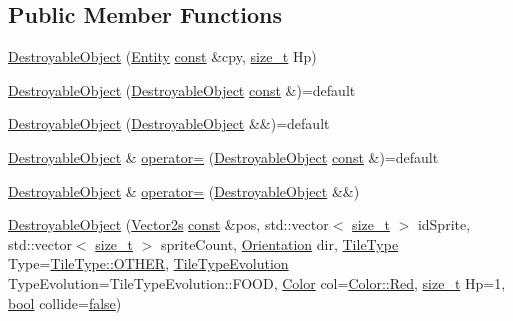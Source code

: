 \subsection*{Public Member Functions}
\begin{DoxyCompactItemize}
\item 
\hyperlink{classarcade_1_1_destroyable_object_afad8b631d299b327eb9c3df2bcaec2b4}{Destroyable\-Object} (\hyperlink{classarcade_1_1_entity}{Entity} \hyperlink{term__entry_8h_a57bd63ce7f9a353488880e3de6692d5a}{const} \&cpy, \hyperlink{nc__alloc_8h_a7b60c5629e55e8ec87a4547dd4abced4}{size\-\_\-t} Hp)
\item 
\hyperlink{classarcade_1_1_destroyable_object_a928fd49d151580c8324ff6e139fa3278}{Destroyable\-Object} (\hyperlink{classarcade_1_1_destroyable_object}{Destroyable\-Object} \hyperlink{term__entry_8h_a57bd63ce7f9a353488880e3de6692d5a}{const} \&)=default
\item 
\hyperlink{classarcade_1_1_destroyable_object_aecbe032df2fc04fa2067507e9cdb57dc}{Destroyable\-Object} (\hyperlink{classarcade_1_1_destroyable_object}{Destroyable\-Object} \&\&)=default
\item 
\hyperlink{classarcade_1_1_destroyable_object}{Destroyable\-Object} \& \hyperlink{classarcade_1_1_destroyable_object_a240c22db6bea4eb1dd04bc5bf6896811}{operator=} (\hyperlink{classarcade_1_1_destroyable_object}{Destroyable\-Object} \hyperlink{term__entry_8h_a57bd63ce7f9a353488880e3de6692d5a}{const} \&)=default
\item 
\hyperlink{classarcade_1_1_destroyable_object}{Destroyable\-Object} \& \hyperlink{classarcade_1_1_destroyable_object_a2c832153b56e69aeec898c9df2b2b15f}{operator=} (\hyperlink{classarcade_1_1_destroyable_object}{Destroyable\-Object} \&\&)
\item 
\hyperlink{classarcade_1_1_destroyable_object_a196652119c01e1e1a647e69ef11a88c9}{Destroyable\-Object} (\hyperlink{namespacearcade_a8e527f7400fbff9c38dc31e0a3dd06a1}{Vector2s} \hyperlink{term__entry_8h_a57bd63ce7f9a353488880e3de6692d5a}{const} \&pos, std\-::vector$<$ \hyperlink{nc__alloc_8h_a7b60c5629e55e8ec87a4547dd4abced4}{size\-\_\-t} $>$ id\-Sprite, std\-::vector$<$ \hyperlink{nc__alloc_8h_a7b60c5629e55e8ec87a4547dd4abced4}{size\-\_\-t} $>$ sprite\-Count, \hyperlink{namespacearcade_a370755573a2c68e25c59bedd4bce1342}{Orientation} dir, \hyperlink{namespacearcade_a61ba576694ea309cdf2b4b66902408ca}{Tile\-Type} Type=\hyperlink{namespacearcade_a61ba576694ea309cdf2b4b66902408caa03570470bad94692ce93e32700d2e1cb}{Tile\-Type\-::\-O\-T\-H\-E\-R}, \hyperlink{namespacearcade_a2e0a64a64203f78c9efb84a1475a8cf4}{Tile\-Type\-Evolution} Type\-Evolution=Tile\-Type\-Evolution\-::\-F\-O\-O\-D, \hyperlink{unionarcade_1_1_color}{Color} col=\hyperlink{unionarcade_1_1_color_a7101e34126fdb3c14d53045681938293}{Color\-::\-Red}, \hyperlink{nc__alloc_8h_a7b60c5629e55e8ec87a4547dd4abced4}{size\-\_\-t} Hp=1, \hyperlink{term__entry_8h_a002004ba5d663f149f6c38064926abac}{bool} collide=\hyperlink{_snake_8cpp_ae6c865df784842196d411c1466b01686}{false})

\end{DoxyCompactItemize}
